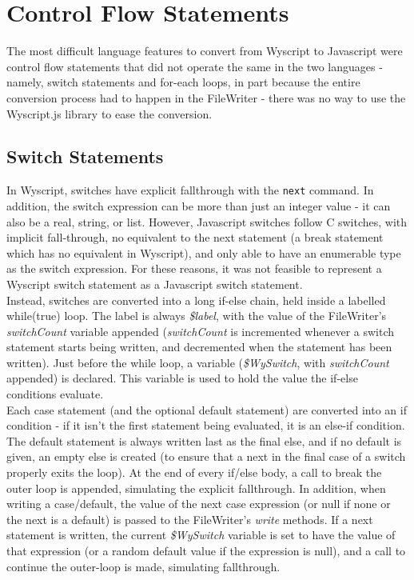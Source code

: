 \chapter{Control Flow Statements}

The most difficult language features to convert from Wyscript to Javascript were control flow statements that did not operate the same in the two languages - namely, switch statements and for-each loops, in part because the entire conversion process had to happen in the FileWriter - there was no way to use the Wyscript.js library to ease the conversion.


\section{Switch Statements}
\label{c_control_switch}

In Wyscript, switches have explicit fallthrough with the \lstinline{next} command. In addition, the switch expression can be more than just an integer value - it can also be a real, string, or list. However, Javascript switches follow C switches, with implicit fall-through, no equivalent to the next statement (a break statement which has no equivalent in Wyscript), and only able to have an enumerable type as the switch expression. For these reasons, it was not feasible to represent a Wyscript switch statement as a Javascript switch statement.\\

Instead, switches are converted into a long if-else chain, held inside a labelled while(true) loop. The label is always {\em \$label}, with the value of the FileWriter's {\em switchCount} variable appended ({\em switchCount} is incremented whenever a switch statement starts being written, and decremented when the statement has been written). Just before the while loop, a variable ({\em \$WySwitch}, with {\em switchCount} appended) is declared. This variable is used to hold the value the if-else conditions evaluate.\\

Each case statement (and the optional default statement) are converted into an if condition - if it isn't the first statement being evaluated, it is an else-if condition. The default statement is always written last as the final else, and if no default is given, an empty else is created (to ensure that a next in the final case of a switch properly exits the loop). At the end of every if/else body, a call to break the outer loop is appended, simulating the explicit fallthrough. In addition, when writing a case/default, the value of the next case expression (or null if none or the next is a default) is passed to the FileWriter's {\em write} methods. If a next statement is written, the current {\em \$WySwitch} variable is set to have the value of that expression (or a random default value if the expression is null), and a call to continue the outer-loop is made, simulating fallthrough.\pagebreak


